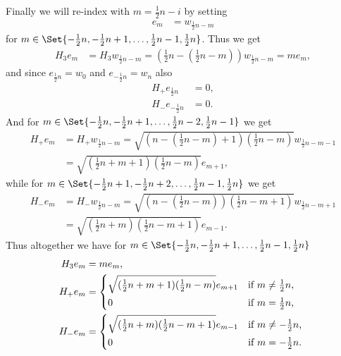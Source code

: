 Finally we will re-index with $m=\tfrac{1}{2}n-i$ by setting
\begin{align*}
  e_m &= w_{\tfrac{1}{2}n-m}
\end{align*}
for $m\in\Set{-\tfrac{1}{2}n,-\tfrac{1}{2}n+1,\dotsc,\tfrac{1}{2}n-1,\tfrac{1}{2}n}$. Thus we get
\begin{align*}
  H_3e_m &= H_3w_{\tfrac{1}{2}n-m} = (\tfrac{1}{2}n-(\tfrac{1}{2}n-m))w_{\tfrac{1}{2}n-m} = me_m,
\end{align*}
and since $e_{\tfrac{1}{2}n} = w_0$ and $e_{-\tfrac{1}{2}n} = w_n$ also
\begin{align*}
  H_+e_{\tfrac{1}{2}n} &= 0,\\
  H_-e_{-\tfrac{1}{2}n} &= 0.
\end{align*}
And for $m\in\Set{-\tfrac{1}{2}n,-\tfrac{1}{2}n+1,\dotsc,\tfrac{1}{2}n-2,\tfrac{1}{2}n-1}$ we get
\begin{align*}
  H_+e_m &= H_+w_{\tfrac{1}{2}n-m} = \sqrt{(n-(\tfrac{1}{2}n-m)+1)(\tfrac{1}{2}n-m)}w_{\tfrac{1}{2}n-m-1} \\
  &= \sqrt{(\tfrac{1}{2}n+m+1)(\tfrac{1}{2}n-m)}e_{m+1},
\end{align*}
while for $m\in\Set{-\tfrac{1}{2}n+1,-\tfrac{1}{2}n+2,\dotsc,\tfrac{1}{2}n-1,\tfrac{1}{2}n}$ we get
\begin{align*}
  H_-e_m &= H_-w_{\tfrac{1}{2}n-m} = \sqrt{(n-(\tfrac{1}{2}n-m))(\tfrac{1}{2}n-m+1)}w_{\tfrac{1}{2}n-m+1} \\
  &= \sqrt{(\tfrac{1}{2}n+m)(\tfrac{1}{2}n-m+1)}e_{m-1}.
\end{align*}
Thus altogether we have for $m\in\Set{-\tfrac{1}{2}n,-\tfrac{1}{2}n+1,\dotsc,\tfrac{1}{2}n-1,\tfrac{1}{2}n}$
\begin{align}
  \begin{split}
    H_3e_m &= me_m,\label{eq:modulerels} \\
    H_+e_m &=
    \begin{dcases*}
      \sqrt{(\tfrac{1}{2}n+m+1)(\tfrac{1}{2}n-m)}e_{m+1} & if $m\neq \tfrac{1}{2}n$, \\
      0 & if $m=\tfrac{1}{2}n$,
    \end{dcases*} \\
    H_-e_m &=
    \begin{dcases*}
      \sqrt{(\tfrac{1}{2}n+m)(\tfrac{1}{2}n-m+1)}e_{m-1} & if $m\neq -\tfrac{1}{2}n$, \\
      0 & if $m=-\tfrac{1}{2}n$.
    \end{dcases*}
  \end{split}
\end{align}

